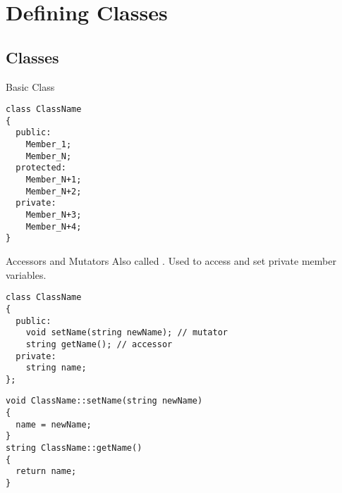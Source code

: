 \documentclass[\main/notes.tex]{subfiles}
\begin{document}
	\setcounter{chapter}{4}
	\chapter{Defining Classes}
		\section{Classes}
			\begin{codebox}{Basic Class}
				\begin{verbatim}
class ClassName
{
  public:
    Member_1;
    Member_N;
  protected:
    Member_N+1;
    Member_N+2;
  private:
    Member_N+3;
    Member_N+4;
}
				\end{verbatim}
			\end{codebox}
			\begin{definition}{Accessors and Mutators}
				Also called . Used to access and set private member variables.
				\begin{verbatim}
class ClassName
{
  public:
    void setName(string newName); // mutator
    string getName(); // accessor
  private:
    string name;
};
				\end{verbatim}
				\pagebreak
				\begin{verbatim}
void ClassName::setName(string newName)
{
  name = newName;
}
string ClassName::getName()
{
  return name;
}
				\end{verbatim}
			\end{definition}
\end{document}
